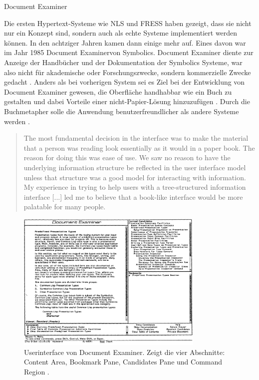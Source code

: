 \begin{section}{Document Examiner}
\label{sec:DocumentExaminer}

Die ersten Hypertext-Systeme wie NLS und FRESS haben gezeigt, dass sie nicht nur ein Konzept sind, sondern auch als echte Systeme implementiert werden können. In den achtziger Jahren kamen dann einige mehr auf. Eines davon war im Jahr 1985 \glqq Document Examiner\grqq{ }von Symbolics. Document Examiner diente zur Anzeige der Handbücher und der Dokumentation der Symbolics Systeme, war also nicht für akademische oder Forschungszwecke, sondern kommerzielle Zwecke gedacht \cite{Walker1987} \cite[S. 50]{Nielsen1995}. Anders als bei vorherigen System sei es Ziel bei der Entwicklung von  Document Examiner gewesen, die Oberfläche handhabbar wie ein Buch zu gestalten und dabei Vorteile einer nicht-Papier-Lösung hinzuzufügen \cite{Walker1987}. Durch die Buchmetapher solle die Anwendung benutzerfreundlicher als andere Systeme werden \cite{Walker1987}. 

\begin{quote}
\glqq The most fundamental decision in the interface was to make the material that a person was reading look essentially as it would in a paper book. The reason for doing this was ease of use. We saw no reason to have the underlying information structure be reflected in the user interface model unless that structure was a good model for interacting with information. My experience in trying to help users with a tree-structured information interface [...] led me to believe that a book-like interface would be more palatable for many people. \grqq{ }\cite{Walker1987}
\end{quote}

\begin{figure}[H]
	\centering
	\includegraphics[width=0.8\textwidth]{image/document}
	\caption{Userinterface von Document Examiner. Zeigt die vier Abschnitte: Content Area, Bookmark Pane, Candidates Pane und Command Region \cite{Walker1987}.}
	\label{fig:ducument}
\end{figure}


\end{section}
